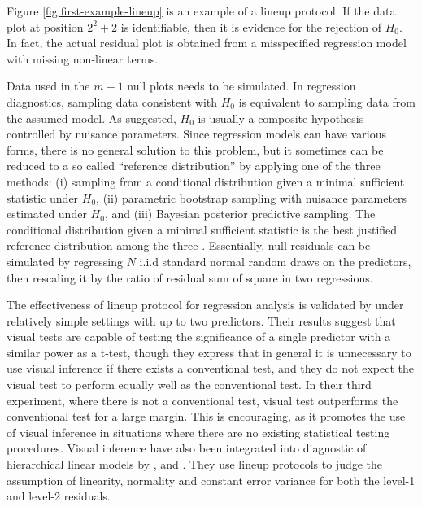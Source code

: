 \documentclass[]{interact}
\theoremstyle{plain}%
\theoremstyle{definition}
\theoremstyle{remark}
\begin{document}
Figure \ref{fig:first-example-lineup} is an example of a lineup
protocol. If the data plot at position \(2^2 + 2\) is identifiable, then
it is evidence for the rejection of \(H_0\). In fact, the actual
residual plot is obtained from a misspecified regression model with
missing non-linear terms.

Data used in the \(m - 1\) null plots needs to be simulated. In
regression diagnostics, sampling data consistent with \(H_0\) is
equivalent to sampling data from the assumed model. As
\citet{buja_statistical_2009} suggested, \(H_0\) is usually a composite
hypothesis controlled by nuisance parameters. Since regression models
can have various forms, there is no general solution to this problem,
but it sometimes can be reduced to a so called ``reference
distribution'' by applying one of the three methods: (i) sampling from a
conditional distribution given a minimal sufficient statistic under
\(H_0\), (ii) parametric bootstrap sampling with nuisance parameters
estimated under \(H_0\), and (iii) Bayesian posterior predictive
sampling. The conditional distribution given a minimal sufficient
statistic is the best justified reference distribution among the three
\citep{buja_statistical_2009}. Essentially, null residuals can be
simulated by regressing \(N\) i.i.d standard normal random draws on the
predictors, then rescaling it by the ratio of residual sum of square in
two regressions.

The effectiveness of lineup protocol for regression analysis is
validated by \citet{majumder_validation_2013} under relatively simple
settings with up to two predictors. Their results suggest that visual
tests are capable of testing the significance of a single predictor with
a similar power as a t-test, though they express that in general it is
unnecessary to use visual inference if there exists a conventional test,
and they do not expect the visual test to perform equally well as the
conventional test. In their third experiment, where there is not a
conventional test, visual test outperforms the conventional test for a
large margin. This is encouraging, as it promotes the use of visual
inference in situations where there are no existing statistical testing
procedures. Visual inference have also been integrated into diagnostic
of hierarchical linear models by \citet{loy2013diagnostic},
\citet{loy2014hlmdiag} and \citet{loy2015you}. They use lineup protocols
to judge the assumption of linearity, normality and constant error
variance for both the level-1 and level-2 residuals.
\end{document}
